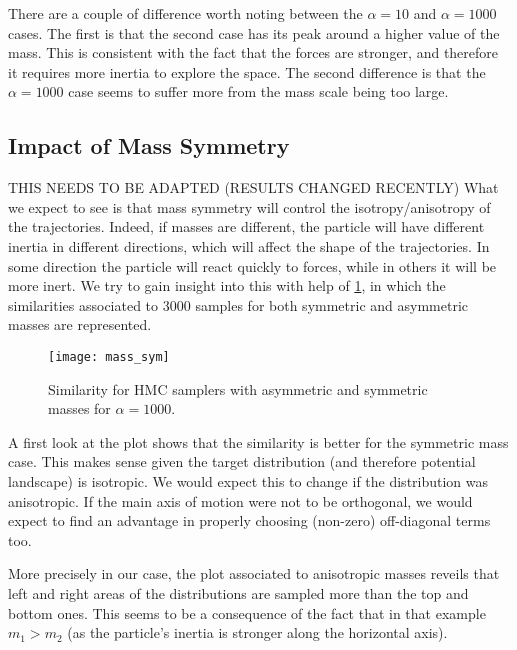 \documentclass[a4paper, 12pt,oneside]{article}
\begin{document}
			There are a couple of difference worth noting between the $\alpha=10$ and $\alpha=1000$ cases. The first is that the second case has its peak around a higher value of the mass. This is consistent with the fact that the forces are stronger, and therefore it requires more inertia to explore the space. The second difference is that the $\alpha=1000$ case seems to suffer more from the mass scale being too large.
			\subsection{Impact of Mass Symmetry}
			THIS NEEDS TO BE ADAPTED (RESULTS CHANGED RECENTLY)
			What we expect to see is that mass symmetry will control the isotropy/anisotropy of the trajectories. Indeed, if masses are different, the particle will have different inertia in different directions, which will affect the shape of the trajectories. In some direction the particle will react quickly to forces, while in others it will be more inert. We try to gain insight into this with help of  \ref{fig:mass-sym}, in which the similarities associated to 3000 samples for both symmetric and asymmetric masses are represented.
			\begin{figure}[htb]
				\centering
					\vspace{0em}
					\texttt{[image: mass\_sym]}
					\caption{Similarity for HMC samplers with asymmetric and symmetric masses for $\alpha=1000$.}
					\label{fig:mass-sym}
			\end{figure}
			A first look at the plot shows that the similarity is better for the symmetric mass case. This makes sense given the target distribution (and therefore potential landscape) is isotropic. We would expect this to change if the distribution was anisotropic. If the main axis of motion were not to be orthogonal, we would expect to find an advantage in properly choosing (non-zero) off-diagonal terms too. 
			
			More precisely in our case, the plot associated to anisotropic masses reveils that left and right areas of the distributions are sampled more than the top and bottom ones. This seems to be a consequence of the fact that in that example $m_1>m_2$ (as the particle's inertia is stronger along the horizontal axis). 
\end{document}
